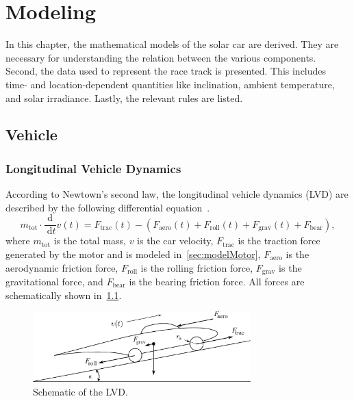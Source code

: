 
\chapter{Modeling}
\label{chp:modeling}

In this chapter, the mathematical models of the solar car are derived. They are necessary for understanding the relation between the various components. Second, the data used to represent the race track is presented. This includes time- and location-dependent quantities like inclination, ambient temperature, and solar irradiance. Lastly, the relevant rules are listed.


\section{Vehicle}

\subsection{Longitudinal Vehicle Dynamics}
\label{sec:modelLVD}
According to Newtown's second law, the longitudinal vehicle dynamics (LVD) are described by the following differential equation~\cite{vps:2007book, sutteben:2017mt}.
\begin{equation}
	m_\mathrm{tot} \cdot \frac{\mathrm{d}}{\;\mathrm{d}t} v(t) = F_\mathrm{trac}(t) - \left(F_\mathrm{aero}(t) + F_\mathrm{roll}(t) + F_\mathrm{grav}(t) + F_\mathrm{bear}\right),
\end{equation}
where $m_\mathrm{tot}$ is the total mass, $v$ is the car velocity, $F_\mathrm{trac}$ is the traction force generated by the motor and is modeled in~\cref{sec:modelMotor},
$F_\mathrm{aero}$ is the aerodynamic friction force, $F_\mathrm{roll}$ is the rolling friction force, $F_\mathrm{grav}$ is the gravitational force, and $F_\mathrm{bear}$ is the bearing friction force. All forces are schematically shown in~\cref{fig:lvd}.
\begin{figure}[htbp]
	\centering
	\includegraphics[width=0.75\textwidth, height=0.25\textwidth]{img/lvd/lvd.pdf}
	\caption{Schematic of the LVD.}
	\label{fig:lvd}
\end{figure}

